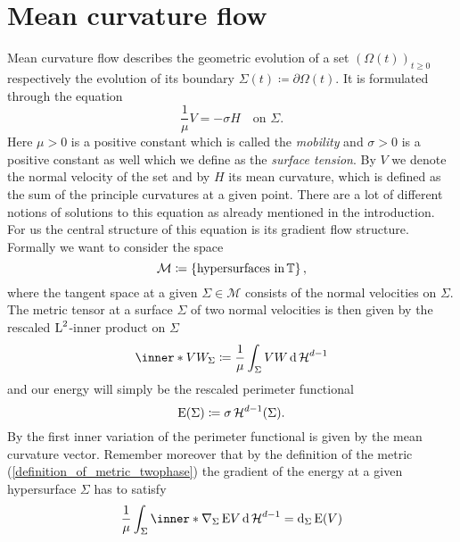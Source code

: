 \section{Mean curvature flow}
	\label{section_mcf}

Mean curvature flow describes the geometric evolution of a set $ ( \Omega ( t ) 
)_{ t \geq 0 } $ respectively the evolution of its boundary $ \Sigma ( t ) 
\coloneqq \partial \Omega ( t ) $. It is formulated through the equation
\begin{equation}
	\label{mcf_twophase_basic_equation}
	\frac{ 1 }{ \mu } V = - \sigma H 
	\quad
	\text{on }
	\Sigma.
\end{equation}
Here $ \mu > 0 $ is a positive constant which is called the \emph{mobility} and 
$ \sigma > 0 $ is a positive constant as well which we define as the 
\emph{surface tension}. By $ V $ we denote the normal velocity of the set and 
by $ H $ its mean curvature, which is defined as the sum of the principle 
curvatures at a given point.
There are a lot of different notions of solutions to this equation as already 
mentioned in the introduction.
For us the central structure of this equation is its gradient flow structure. Formally we want to consider the space
\begin{equation*}
	\mathcal{ M }
	\coloneqq
	\left\{
		\text{hypersurfaces in} \operatorname{\mathbb{T}}
	\right\},
\end{equation*}
where the tangent space at a given $ \Sigma \in \mathcal{ M } $ consists of the normal velocities on $ \Sigma $.
The metric tensor at a surface $ \Sigma $ of two normal velocities is then 
given by the rescaled $ \operatorname{L}^{ 2 } $-inner product on $ \Sigma $
\begin{equation}
	\label{definition_of_metric_twophase}
	\inner*{ V }{ W }_{ \Sigma }
	\coloneqq
	\frac{ 1 }{ \mu }
	\int_{ \Sigma }
		V W
	\dd{ \hm^{ d - 1 } }
\end{equation}
and our energy will simply be the rescaled perimeter functional
\begin{equation*}
	\operatorname{E} ( \Sigma )
	\coloneqq
	\sigma \operatorname{\mathcal{H}}^{ d -1 } ( \Sigma ).
\end{equation*}
By \cite[Thm.~17.5]{maggi_sets_of_finite_perimeter} the first inner variation 
of the perimeter functional is given by the mean curvature vector. 
Remember moreover that by the definition of the metric 
(\ref{definition_of_metric_twophase}) the gradient of the energy at a given 
hypersurface $ \Sigma $ has to satisfy
\begin{equation*}
	\frac{ 1 }{ \mu }
	\int_{ \Sigma }
		\inner*{ \nabla_{ \Sigma } \energy }{ V }
	\dd{ \hm^{ d - 1 } }
	=
	\dd_{ \Sigma }
	\energy ( V )
\end{equation*} 
